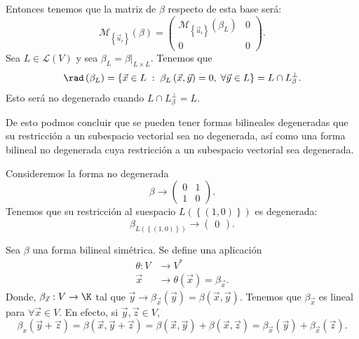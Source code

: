 Entonces tenemos que la matriz de $\displaystyle \beta  $ respecto de esta base será:
\[\mathcal{M}_{ \left\{ \vec{u}_{i}\right\} }\left(\beta \right) = \begin{pmatrix} \mathcal{M}_{ \left\{ \vec{u}_{i}\right\} }\left(\beta _{L}\right) & 0 \\
0 & 0\end{pmatrix} .\]
Sea $\displaystyle L \in \mathcal{L}\left(V\right) $ y sea $\displaystyle \beta_{L} = \beta|_{L \times L} $. Tenemos que 
\[ \rad\left(\beta_{L}\right) = \left\{ \vec{x} \in L \; : \; \beta_{L}\left(\vec{x}, \vec{y}\right) = 0, \; \forall \vec{y} \in L\right\} = L \cap L^{\perp }_{\beta} .\]
Esto será no degenerado cuando $\displaystyle L \cap L^{\perp }_{\beta }= L $.
\begin{observation}
\normalfont De esto podmos concluir que se pueden tener formas bilineales degeneradas que su restricción a un subespacio vectorial sea no degenerada, así como una forma bilineal no degenerada cuya restricción a un subespacio vectorial sea degenerada.
\end{observation}
\begin{eg}
\normalfont Consideremos la forma no degenerada
\[\beta \to \begin{pmatrix} 0 & 1 \\ 1 & 0 \end{pmatrix} .\]
Tenemos que su restricción al suespacio $\displaystyle L\left( \left\{ \left(1,0\right)\right\} \right) $ es degenerada:
\[ \beta_{L \left( \left\{ \left(1,0\right)\right\} \right)} \to \begin{pmatrix} 0 \end{pmatrix} .\]
\end{eg}
Sea $\displaystyle \beta  $ una forma bilineal simétrica. Se define una aplicación
\[
\begin{split}
	\theta : V & \to V^{*} \\
	\vec{x} & \to \theta\left(\vec{x}\right) = \beta_{\vec{x}}.
\end{split}
\]
Donde, $\displaystyle \beta_{\vec{x}} : V \to \K  $ tal que $\displaystyle \vec{y} \to \beta_{\vec{x}}\left(\vec{y}\right) = \beta\left(\vec{x}, \vec{y}\right) $. Tenemos que $\displaystyle \beta_{\vec{x}} $ es lineal para $\displaystyle \forall \vec{x} \in V $. En efecto, si $\displaystyle \vec{y}, \vec{z} \in V $,
\[ \beta_{x}\left(\vec{y} + \vec{z}\right) = \beta\left(\vec{x}, \vec{y} + \vec{z}\right) = \beta\left(\vec{x}, \vec{y}\right) + \beta\left(\vec{x}, \vec{z}\right) = \beta_{\vec{x}}\left(\vec{y}\right) + \beta_{\vec{x}}\left(\vec{z}\right) .\]
